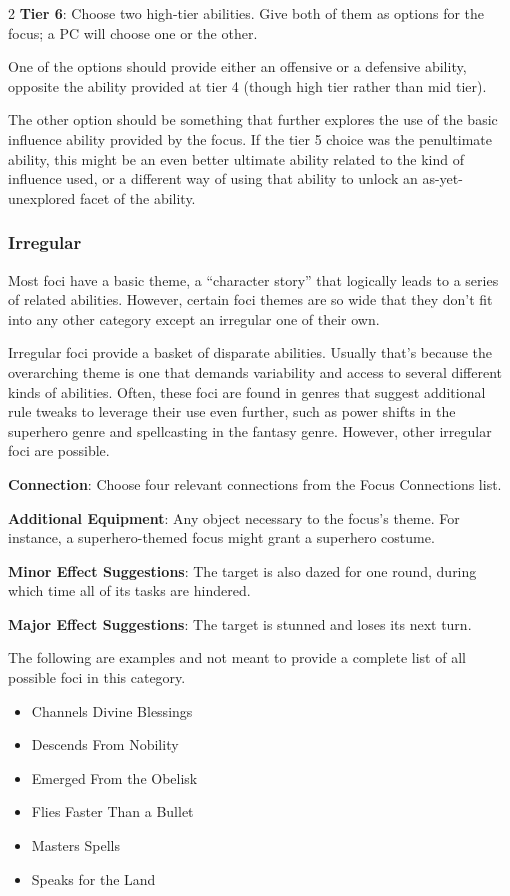 \begin{multicols}{2}
\textbf{Tier 6}: Choose two high-tier abilities. Give both of them as options for the focus; a PC will choose one or the other.

One of the options should provide either an offensive or a defensive ability, opposite the ability provided at tier 4 (though high tier rather than mid tier).

The other option should be something that further explores the use of the basic influence ability provided by the focus. If the tier 5 choice was the penultimate ability, this might be an even better ultimate ability related to the kind of influence used, or a different way of using that ability to unlock an as-yet-unexplored facet of the ability.

\subsubsection{Irregular}

Most foci have a basic theme, a “character story” that logically leads to a series of related abilities. However, certain foci themes are so wide that they don’t fit into any other category except an irregular one of their own.

Irregular foci provide a basket of disparate abilities. Usually that’s because the overarching theme is one that demands variability and access to several different kinds of abilities. Often, these foci are found in genres that suggest additional rule tweaks to leverage their use even further, such as power shifts in the superhero genre and spellcasting in the fantasy genre. However, other irregular foci are possible.

\textbf{Connection}: Choose four relevant connections from the Focus Connections list. 

\textbf{Additional Equipment}: Any object necessary to the focus’s theme. For instance, a superhero-themed focus might grant a superhero costume.

\textbf{Minor Effect Suggestions}: The target is also dazed for one round, during which time all of its tasks are hindered.

\textbf{Major Effect Suggestions}: The target is stunned and loses its next turn.

The following are examples and not meant to provide a complete list of all possible foci in this category.

\begin{itemize} 
\item Channels Divine Blessings
\item Descends From Nobility
\item Emerged From the Obelisk
\item Flies Faster Than a Bullet
\item Masters Spells
\item Speaks for the Land
\end{itemize}


\end{multicols}
